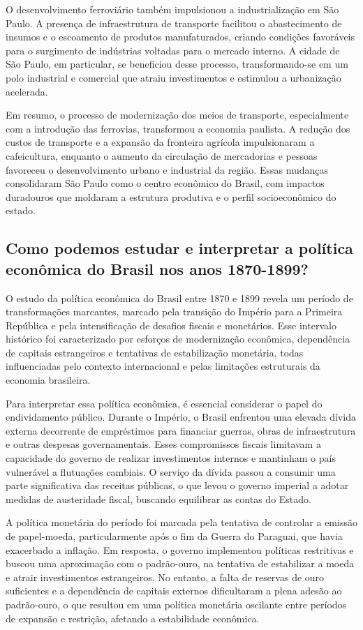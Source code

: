 \documentclass[a4paper,12pt]{article}[abntex2]
\begin{document}
O desenvolvimento ferroviário também impulsionou a industrialização em São Paulo. A presença de infraestrutura de transporte facilitou o abastecimento de insumos e o escoamento de produtos manufaturados, criando condições favoráveis para o surgimento de indústrias voltadas para o mercado interno. A cidade de São Paulo, em particular, se beneficiou desse processo, transformando-se em um polo industrial e comercial que atraiu investimentos e estimulou a urbanização acelerada.

Em resumo, o processo de modernização dos meios de transporte, especialmente com a introdução das ferrovias, transformou a economia paulista. A redução dos custos de transporte e a expansão da fronteira agrícola impulsionaram a cafeicultura, enquanto o aumento da circulação de mercadorias e pessoas favoreceu o desenvolvimento urbano e industrial da região. Essas mudanças consolidaram São Paulo como o centro econômico do Brasil, com impactos duradouros que moldaram a estrutura produtiva e o perfil socioeconômico do estado.

\subsection{\textbf{Como podemos estudar e interpretar a política econômica do Brasil nos anos 1870-1899?}}

O estudo da política econômica do Brasil entre 1870 e 1899 revela um período de transformações marcantes, marcado pela transição do Império para a Primeira República e pela intensificação de desafios fiscais e monetários. Esse intervalo histórico foi caracterizado por esforços de modernização econômica, dependência de capitais estrangeiros e tentativas de estabilização monetária, todas influenciadas pelo contexto internacional e pelas limitações estruturais da economia brasileira.

Para interpretar essa política econômica, é essencial considerar o papel do endividamento público. Durante o Império, o Brasil enfrentou uma elevada dívida externa decorrente de empréstimos para financiar guerras, obras de infraestrutura e outras despesas governamentais. Esses compromissos fiscais limitavam a capacidade do governo de realizar investimentos internos e mantinham o país vulnerável a flutuações cambiais. O serviço da dívida passou a consumir uma parte significativa das receitas públicas, o que levou o governo imperial a adotar medidas de austeridade fiscal, buscando equilibrar as contas do Estado.

A política monetária do período foi marcada pela tentativa de controlar a emissão de papel-moeda, particularmente após o fim da Guerra do Paraguai, que havia exacerbado a inflação. Em resposta, o governo implementou políticas restritivas e buscou uma aproximação com o padrão-ouro, na tentativa de estabilizar a moeda e atrair investimentos estrangeiros. No entanto, a falta de reservas de ouro suficientes e a dependência de capitais externos dificultaram a plena adesão ao padrão-ouro, o que resultou em uma política monetária oscilante entre períodos de expansão e restrição, afetando a estabilidade econômica.
\end{document}
